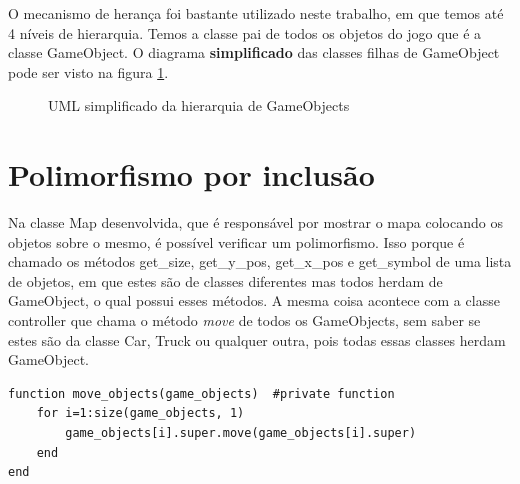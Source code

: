 \documentclass[rel_mlp]{iiufrgs}
\begin{document}
O mecanismo de herança foi bastante utilizado neste trabalho, em que temos até 4 níveis de hierarquia. Temos a classe pai de todos os objetos do jogo que é a classe GameObject. O diagrama \textbf{simplificado} das classes filhas de GameObject  pode ser visto na figura \ref{fig:figura2}.

\begin{figure}[htb]
    \centering
     \caption{UML simplificado da hierarquia de GameObjects}
    \label{fig:figura2}
\end{figure}

 


\section{Polimorfismo por inclusão}

Na classe Map desenvolvida, que é responsável por mostrar o mapa colocando os objetos sobre o mesmo, é possível verificar um polimorfismo. Isso porque é chamado os métodos get\_size, get\_y\_pos, get\_x\_pos e get\_symbol de uma lista de objetos, em que estes são de classes diferentes mas todos herdam de GameObject, o qual possui esses métodos. A mesma coisa acontece com a classe controller que chama o método \textit{move} de todos os GameObjects, sem saber se estes são da classe Car, Truck ou qualquer outra, pois todas essas classes herdam GameObject.
\begin{lstlisting}[frame=single]
function move_objects(game_objects)  #private function
    for i=1:size(game_objects, 1)
        game_objects[i].super.move(game_objects[i].super)
    end
end
\end{lstlisting}
\end{document}
